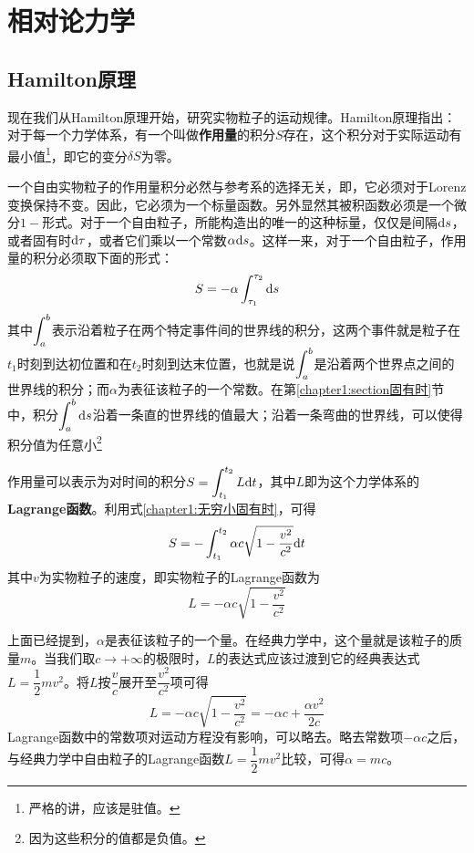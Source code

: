\chapter{相对论力学}

\section{Hamilton原理}%

现在我们从Hamilton原理开始，研究实物粒子的运动规律。Hamilton原理指出：对于每一个力学体系，有一个叫做{\bf 作用量}的积分$S$存在，这个积分对于实际运动有最小值\footnote{严格的讲，应该是驻值。}，即它的变分$\delta S$为零。

一个自由实物粒子的作用量积分必然与参考系的选择无关，即，它必须对于Lorenz变换保持不变。因此，它必须为一个标量函数。另外显然其被积函数必须是一个微分$1-$形式。对于一个自由粒子，所能构造出的唯一的这种标量，仅仅是间隔$\mathrm{d} s$，或者固有时$\mathrm{d} \tau$，或者它们乘以一个常数$\alpha\mathrm{d} s$。这样一来，对于一个自由粒子，作用量的积分必须取下面的形式：
\begin{equation*}
	S = -\alpha \int_{\tau_1}^{\tau_2} \mathrm{d} s
\end{equation*}
其中$\displaystyle \int_a^b$表示沿着粒子在两个特定事件间的世界线的积分，这两个事件就是粒子在$t_1$时刻到达初位置和在$t_2$时刻到达末位置，也就是说$\displaystyle \int_a^b$是沿着两个世界点之间的世界线的积分；而$\alpha$为表征该粒子的一个常数。在第\ref{chapter1:section固有时}节中，积分$\displaystyle\int_a^b \mathrm{d} s$沿着一条直的世界线的值最大；沿着一条弯曲的世界线，可以使得积分值为任意小\footnote{因为这些积分的值都是负值。}

作用量可以表示为对时间的积分$\displaystyle S = \int_{t_1}^{t_2} L\mathrm{d} t$，其中$L$即为这个力学体系的{\bf Lagrange函数}。利用式\eqref{chapter1:无穷小固有时}，可得
\begin{equation*}
	S = -\int_{t_1}^{t_2} \alpha c\sqrt{1-\frac{v^2}{c^2}} \mathrm{d} t
\end{equation*}
其中$v$为实物粒子的速度，即实物粒子的Lagrange函数为
\begin{equation}
	L = -\alpha c\sqrt{1-\frac{v^2}{c^2}} 
\end{equation}

上面已经提到，$\alpha$是表征该粒子的一个量。在经典力学中，这个量就是该粒子的质量$m$。当我们取$c\to +\infty$的极限时，$L$的表达式应该过渡到它的经典表达式$L=\dfrac12 mv^2$。将$L$按$\dfrac{v}{c}$展开至$\dfrac{v^2}{c^2}$项可得
\begin{equation*}
	L = -\alpha c\sqrt{1-\dfrac{v^2}{c^2}} = -\alpha c+\frac{\alpha v^2}{2c}
\end{equation*}
Lagrange函数中的常数项对运动方程没有影响，可以略去。略去常数项$-\alpha c$之后，与经典力学中自由粒子的Lagrange函数$L=\dfrac12 mv^2$比较，可得$\alpha=mc$。

